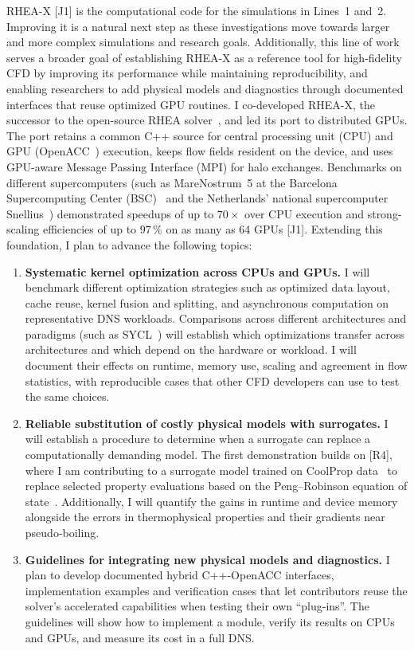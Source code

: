 \documentclass[11pt]{article}
\newcommand{\NEW}[1]{\iffinal #1\else{\color{red}#1}\fi}
\begin{document}
RHEA-X [J1] is the computational code for the simulations in Lines~1 and~2. 
Improving it is a natural next step as these investigations move towards larger and more complex simulations and research goals. 
Additionally, this line of work serves a broader goal of establishing RHEA-X as a reference tool for high-fidelity CFD by improving its performance while maintaining reproducibility, and enabling researchers to add physical models and diagnostics through documented interfaces that reuse optimized GPU routines.
I co-developed RHEA-X, the successor to the open-source RHEA solver~\cite{RHEASoftware}, and led its port to distributed GPUs. 
The port retains a common C++ source for \NEW{central processing unit (CPU)} and GPU (OpenACC~\cite{OpenACC}) execution, keeps flow fields resident on the device, and uses GPU-aware \NEW{Message Passing Interface (MPI)} for halo exchanges. 
Benchmarks on different supercomputers (such as MareNostrum~5 at the Barcelona Supercomputing Center (BSC)~\cite{BSC} and the Netherlands' national supercomputer Snellius~\cite{Snellius}) demonstrated speedups of up to $70\times$ over CPU execution and strong-scaling efficiencies of up to $97\,\%$ on as many as 64 GPUs [J1]. 
Extending this foundation, I plan to advance the following topics:
\begin{enumerate}
	\item \textbf{Systematic kernel optimization across CPUs and GPUs.}
	I will benchmark different optimization strategies such as optimized data layout, cache reuse, kernel fusion and splitting, and asynchronous computation on representative DNS workloads. 
	Comparisons across different architectures and paradigms (such as SYCL~\cite{SYCL}) will establish which optimizations transfer across architectures and which depend on the hardware or workload. 
	I will document their effects on runtime, memory use, scaling and agreement in flow statistics, with reproducible cases that other CFD developers can use to test the same choices.
	
	\item \textbf{Reliable substitution of costly physical models with surrogates.}
	I will establish a procedure to determine when a surrogate can replace a computationally demanding model. 
	The first demonstration builds on [R4], where I am contributing to a surrogate model trained on CoolProp data~\cite{CoolProp2014} to replace selected property evaluations based on the Peng--Robinson equation of state~\cite{PengRobinson1976}. 
	Additionally, I will quantify the gains in runtime and device memory alongside the errors in thermophysical properties and their gradients near pseudo-boiling.
	
	\item \textbf{Guidelines for integrating new physical models and diagnostics.}
	I plan to develop documented hybrid C++-OpenACC interfaces, implementation examples and verification cases that let contributors reuse the solver's accelerated capabilities when testing their own ``plug-ins''. 
	The guidelines will show how to implement a module, verify its results on CPUs and GPUs, and measure its cost in a full DNS. 
\end{enumerate}
\end{document}
